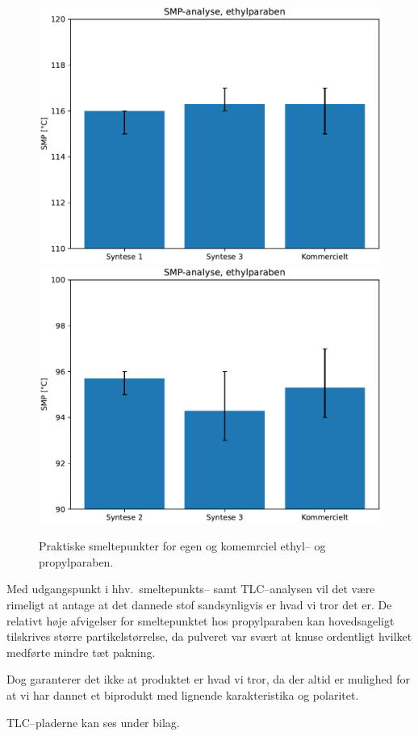     \begin{figure}[H]
        \includegraphics[width=.48\linewidth]{billeder/ethylsmp}
        \includegraphics[width=.48\linewidth]{billeder/propylsmp}
        \caption{Praktiske smeltepunkter for egen og komemrciel ethyl-- og propylparaben.}
    \end{figure}
    Med udgangspunkt i hhv.\ smeltepunkts-- samt TLC--analysen vil det være rimeligt at antage at det dannede stof sandsynligvis er hvad vi tror det er. De relativt høje afvigelser for smeltepunktet hos propylparaben kan hovedsageligt tilskrives større partikelstørrelse, da pulveret var svært at knuse ordentligt hvilket medførte mindre tæt pakning.

    Dog garanterer det ikke at produktet er hvad vi tror, da der altid er mulighed for at vi har dannet et biprodukt med lignende karakteristika og polaritet.

    TLC--pladerne kan ses under bilag.

